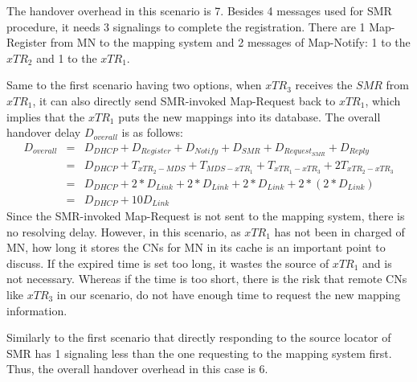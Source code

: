 The handover overhead in this scenario is 7. Besides 4 messages used for SMR procedure, it needs 3 signalings to complete the registration. There are 1 Map-Register from MN to the mapping system and 2 messages of Map-Notify: 1 to the $xTR_2$ and 1 to the $xTR_1$.

Same to the first scenario having two options, when $xTR_3$ receives the $SMR$ from $xTR_1$, it can also directly send SMR-invoked Map-Request back to $xTR_1$, which implies that the $xTR_1$ puts the new mappings into its database. The overall handover delay $D_{overall}$ is as follows:
\begin{eqnarray}
D_{overall} &=& D_{DHCP} + D_{Register} + D_{Notify} + D_{SMR} + D_{Request_{SMR}} + D_{Reply} \nonumber \\
&=& D_{DHCP} + T_{xTR_2-MDS} + T_{MDS-xTR_1} + T_{xTR_1-xTR_3} + 2T_{xTR_2-xTR_3} \nonumber \\
&=& D_{DHCP} +2*D_{Link} + 2*D_{Link} + 2*D_{Link} + 2*(2*D_{Link}) \nonumber \\
&=& D_{DHCP} + 10D_{Link} 
\end{eqnarray}
Since the SMR-invoked Map-Request is not sent to the mapping system, there is no resolving delay. %
However, in this scenario, as $xTR_1$ has not been in charged of MN, how long it stores the CNs for MN in its cache is an important point to discuss. If the expired time is set too long, it wastes the source of $xTR_1$ and is not necessary. Whereas if the time is too short, there is the risk that remote CNs like $xTR_3$ in our scenario, do not have enough time to request the new mapping information.

Similarly to the first scenario that directly responding to the source locator of SMR has 1 signaling less than the one requesting to the mapping system first. Thus, the overall handover overhead in this case is 6.

